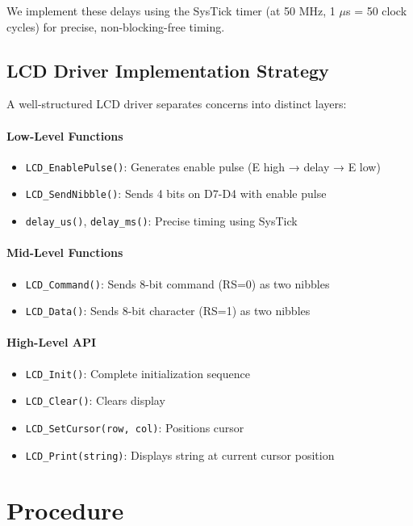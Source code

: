 \noindent
We implement these delays using the SysTick timer (at 50 MHz, 1 $\mu$s = 50 clock cycles) for precise, non-blocking-free timing.

\subsection{LCD Driver Implementation Strategy}

A well-structured LCD driver separates concerns into distinct layers:

\paragraph{Low-Level Functions}
\begin{itemize}[nosep]
  \item \texttt{LCD\_EnablePulse()}: Generates enable pulse (E high → delay → E low)
  \item \texttt{LCD\_SendNibble()}: Sends 4 bits on D7-D4 with enable pulse
  \item \texttt{delay\_us()}, \texttt{delay\_ms()}: Precise timing using SysTick
\end{itemize}

\paragraph{Mid-Level Functions}
\begin{itemize}[nosep]
  \item \texttt{LCD\_Command()}: Sends 8-bit command (RS=0) as two nibbles
  \item \texttt{LCD\_Data()}: Sends 8-bit character (RS=1) as two nibbles
\end{itemize}

\paragraph{High-Level API}
\begin{itemize}[nosep]
  \item \texttt{LCD\_Init()}: Complete initialization sequence
  \item \texttt{LCD\_Clear()}: Clears display
  \item \texttt{LCD\_SetCursor(row, col)}: Positions cursor
  \item \texttt{LCD\_Print(string)}: Displays string at current cursor position
\end{itemize}

\newpage
\section{Procedure}

